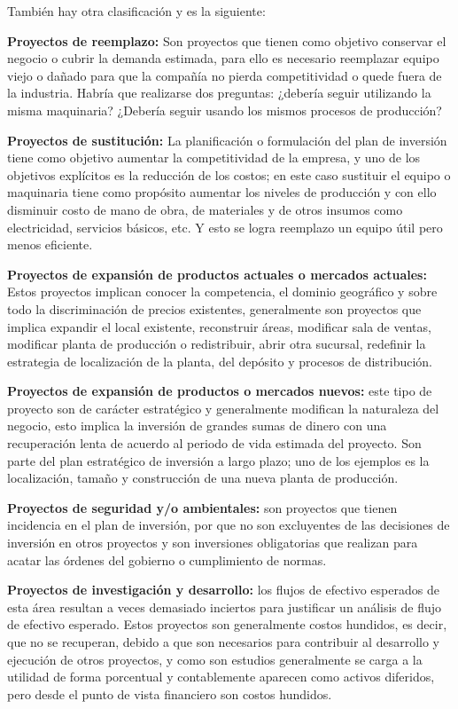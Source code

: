 \documentclass[12pt, a4paper]{article}
\begin{document}
También hay otra clasificación y es la siguiente:

\textbf{Proyectos de reemplazo:} Son proyectos que tienen como objetivo conservar el negocio o cubrir la demanda estimada, para ello es necesario reemplazar equipo viejo o dañado para que la compañía no pierda competitividad o quede fuera de la industria. Habría que realizarse dos preguntas: ¿debería seguir utilizando la misma maquinaria? ¿Debería seguir usando los mismos procesos de producción?

\textbf{Proyectos de sustitución:} La planificación o formulación del plan de inversión tiene como objetivo aumentar la competitividad de la empresa, y uno de los objetivos explícitos es la reducción de los costos; en este caso sustituir el equipo o maquinaria tiene como propósito aumentar los niveles de producción y con ello disminuir costo de mano de obra, de materiales y de otros insumos como electricidad, servicios básicos, etc. Y esto se logra reemplazo un equipo útil pero menos eficiente.

\textbf{Proyectos de expansión de productos actuales o mercados actuales:} Estos proyectos implican conocer la competencia, el dominio geográfico y sobre todo la discriminación de precios existentes, generalmente son proyectos que implica expandir el local existente, reconstruir áreas, modificar sala de ventas, modificar planta de producción o redistribuir, abrir otra sucursal, redefinir la estrategia de localización de la planta, del depósito y procesos de distribución.

\textbf{Proyectos de expansión de productos o mercados nuevos:} este tipo de proyecto son de carácter estratégico y generalmente modifican la naturaleza del negocio, esto implica la inversión de grandes sumas de dinero con una recuperación lenta de acuerdo al periodo de vida estimada del proyecto. Son parte del plan estratégico de inversión a largo plazo; uno de los ejemplos es la localización, tamaño y construcción de una nueva planta de producción.

\textbf{Proyectos de seguridad y/o ambientales:} son proyectos que tienen incidencia en el plan de inversión, por que no son excluyentes de las decisiones de inversión en otros proyectos y son inversiones obligatorias que realizan para acatar las órdenes del gobierno o cumplimiento de normas.

\textbf{Proyectos de investigación y desarrollo:} los flujos de efectivo esperados de esta área resultan a veces demasiado inciertos para justificar un análisis de flujo de efectivo esperado. Estos proyectos son generalmente costos hundidos, es decir, que no se recuperan, debido a que son necesarios para contribuir al desarrollo y ejecución de otros proyectos, y como son estudios generalmente se carga a la utilidad de forma porcentual y contablemente aparecen como activos diferidos, pero desde el punto de vista financiero son costos hundidos.
\end{document}
